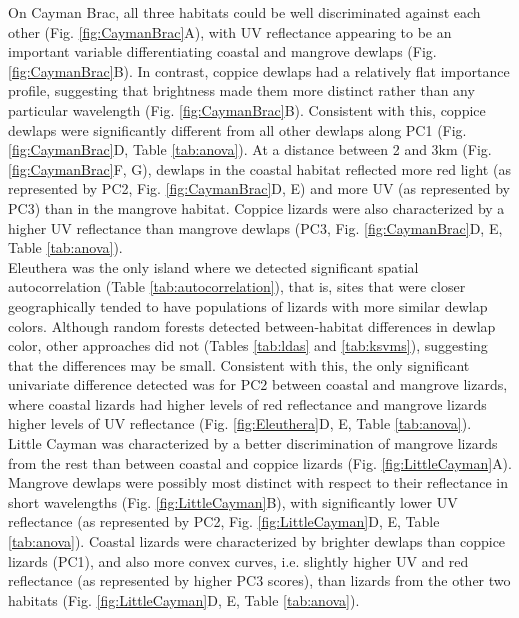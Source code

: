 On Cayman Brac, all three habitats could be well discriminated against each other (Fig. \ref{fig:CaymanBrac}A), with UV reflectance appearing to be an important variable differentiating coastal and mangrove dewlaps (Fig. \ref{fig:CaymanBrac}B). In contrast, coppice dewlaps had a relatively flat importance profile, suggesting that brightness made them more distinct rather than any particular wavelength (Fig. \ref{fig:CaymanBrac}B). Consistent with this, coppice dewlaps were significantly different from all other dewlaps along PC1 (Fig. \ref{fig:CaymanBrac}D, Table \ref{tab:anova}). At a distance between 2 and 3km (Fig. \ref{fig:CaymanBrac}F, G), dewlaps in the coastal habitat reflected more red light (as represented by PC2, Fig. \ref{fig:CaymanBrac}D, E) and more UV (as represented by PC3) than in the mangrove habitat. Coppice lizards were also characterized by a higher UV reflectance than mangrove dewlaps (PC3, Fig. \ref{fig:CaymanBrac}D, E, Table \ref{tab:anova}).\\

Eleuthera was the only island where we detected significant spatial autocorrelation (Table \ref{tab:autocorrelation}), that is, sites that were closer geographically tended to have populations of lizards with more similar dewlap colors. Although random forests detected between-habitat differences in dewlap color, other approaches did not (Tables \ref{tab:ldas} and \ref{tab:ksvms}), suggesting that the differences may be small. Consistent with this, the only significant univariate difference detected was for PC2 between coastal and mangrove lizards, where coastal lizards had higher levels of red reflectance and mangrove lizards higher levels of UV reflectance (Fig. \ref{fig:Eleuthera}D, E, Table \ref{tab:anova}).\\

Little Cayman was characterized by a better discrimination of mangrove lizards from the rest than between coastal and coppice lizards (Fig. \ref{fig:LittleCayman}A). Mangrove dewlaps were possibly most distinct with respect to their reflectance in short wavelengths (Fig. \ref{fig:LittleCayman}B), with significantly lower UV reflectance (as represented by PC2, Fig. \ref{fig:LittleCayman}D, E, Table \ref{tab:anova}). Coastal lizards were characterized by brighter dewlaps than coppice lizards (PC1), and also more convex curves, i.e. slightly higher UV and red reflectance (as represented by higher PC3 scores), than lizards from the other two habitats (Fig. \ref{fig:LittleCayman}D, E, Table \ref{tab:anova}).\\

